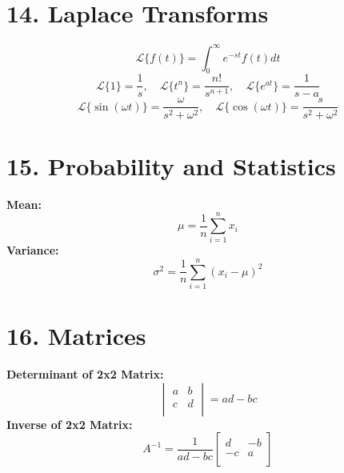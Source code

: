 \documentclass[fleqn]{article}
\begin{document}
\begin{multicols}{2}
\section*{14. Laplace Transforms}
\[
\mathcal{L}\{f(t)\} = \int_0^{\infty} e^{-st} f(t) dt
\]
\[
\mathcal{L}\{1\} = \frac{1}{s}, \quad \mathcal{L}\{t^n\} = \frac{n!}{s^{n+1}}, \quad \mathcal{L}\{e^{at}\} = \frac{1}{s - a}
\]
\[
\mathcal{L}\{\sin(\omega t)\} = \frac{\omega}{s^2 + \omega^2}, \quad \mathcal{L}\{\cos(\omega t)\} = \frac{s}{s^2 + \omega^2}
\]

\section*{15. Probability and Statistics}
\textbf{Mean:}
\[
\mu = \frac{1}{n} \sum_{i=1}^{n} x_i
\]
\textbf{Variance:}
\[
\sigma^2 = \frac{1}{n} \sum_{i=1}^{n} (x_i - \mu)^2
\]

\section*{16. Matrices}
\textbf{Determinant of 2x2 Matrix:}
\[
\begin{vmatrix}
a & b \\
c & d \\
\end{vmatrix} = ad - bc
\]
\textbf{Inverse of 2x2 Matrix:}
\[
A^{-1} = \frac{1}{ad - bc}
\begin{bmatrix}
d & -b \\
-c & a \\
\end{bmatrix}
\]

\end{multicols}
\end{document}
